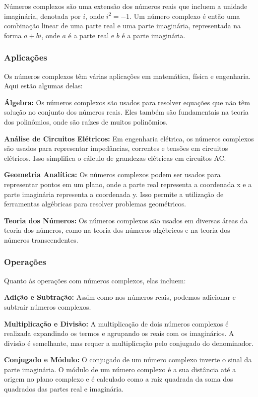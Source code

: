 \documentclass[12pt]{article}
\begin{document}
Números complexos são uma extensão dos números reais que incluem a unidade imaginária, denotada por $i$, onde $i^2 = -1$. Um número complexo é então uma combinação linear de uma parte real e uma parte imaginária, representada na forma $a + bi$, onde $a$ é a parte real e $b$ é a parte imaginária.

\subsubsection{Aplicações}

Os números complexos têm várias aplicações em matemática, física e engenharia. Aqui estão algumas delas:

\textbf{Álgebra:} Os números complexos são usados para resolver equações que não têm solução no conjunto dos números reais. Eles também são fundamentais na teoria dos polinômios, onde são raízes de muitos polinômios.

\textbf{Análise de Circuitos Elétricos:} Em engenharia elétrica, os números complexos são usados para representar impedâncias, correntes e tensões em circuitos elétricos. Isso simplifica o cálculo de grandezas elétricas em circuitos AC.

\textbf{Geometria Analítica:} Os números complexos podem ser usados para representar pontos em um plano, onde a parte real representa a coordenada x e a parte imaginária representa a coordenada y. Isso permite a utilização de ferramentas algébricas para resolver problemas geométricos.

\textbf{Teoria dos Números:} Os números complexos são usados em diversas áreas da teoria dos números, como na teoria dos números algébricos e na teoria dos números transcendentes.

\subsubsection{Operações}

Quanto às operações com números complexos, elas incluem:

\textbf{Adição e Subtração:} Assim como nos números reais, podemos adicionar e subtrair números complexos.

\textbf{Multiplicação e Divisão:} A multiplicação de dois números complexos é realizada expandindo os termos e agrupando os reais com os imaginários. A divisão é semelhante, mas requer a multiplicação pelo conjugado do denominador.

\textbf{Conjugado e Módulo:} O conjugado de um número complexo inverte o sinal da parte imaginária. O módulo de um número complexo é a sua distância até a origem no plano complexo e é calculado como a raiz quadrada da soma dos quadrados das partes real e imaginária.
\end{document}
